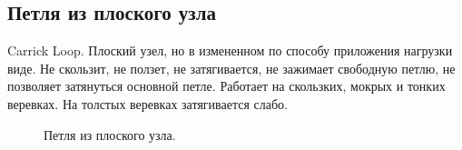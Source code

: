 \subsection{Петля из плоского узла}

Carrick Loop. Плоский узел, но в измененном по способу приложения нагрузки виде. Не скользит, не ползет, не затягивается, не зажимает свободную петлю, не позволяет затянуться основной петле. Работает на скользких, мокрых и тонких веревках. На толстых веревках затягивается слабо.

\begin{figure}[H]\centering
\end{figure}

\begin{figure}[H]\centering
	\caption{Петля из плоского узла.}\label{ris:Carrick_Loop}
\end{figure}
